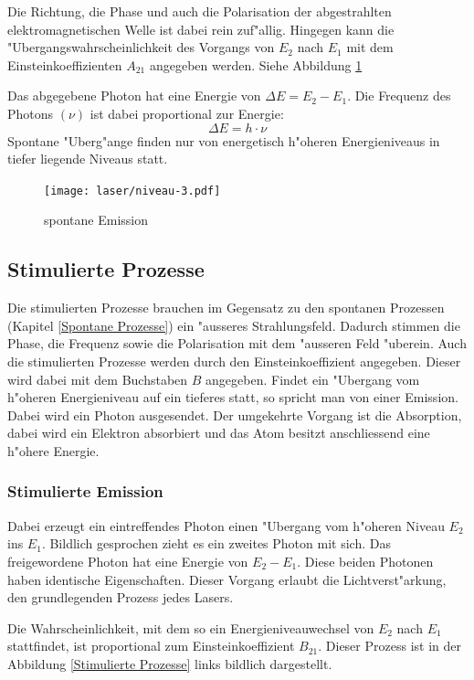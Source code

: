\begin{refsection}
Die Richtung, die Phase und auch die Polarisation der abgestrahlten
elektromagnetischen Welle ist dabei rein zuf"allig.
Hingegen kann die "Ubergangswahrscheinlichkeit des Vorgangs von $E_2$ nach
$E_1$ mit dem Einsteinkoeffizienten $A_{21}$ angegeben werden.
Siehe Abbildung \ref{spontane Emission}

Das abgegebene Photon hat eine Energie von $\Delta E = E_2 - E_1$.
Die Frequenz des Photons $(\nu)$ ist dabei proportional zur Energie:
\[ \Delta E = h\cdot \nu\]
Spontane "Uberg"ange finden nur von energetisch h"oheren Energieniveaus in
tiefer liegende Niveaus statt.

\begin{figure}
\centering
\texttt{[image: laser/niveau-3.pdf]}
\caption{spontane Emission}
\label{spontane Emission}
\end{figure}


\subsection{Stimulierte Prozesse}
Die stimulierten Prozesse brauchen im Gegensatz zu den spontanen
Prozessen (Kapitel \ref{Spontane Prozesse}) ein "ausseres Strahlungsfeld.
Dadurch stimmen die Phase, die Frequenz sowie die Polarisation mit dem
"ausseren Feld "uberein.
Auch die stimulierten Prozesse werden durch den Einsteinkoeffizient angegeben.
Dieser wird dabei mit dem Buchstaben $B$ angegeben.
Findet ein "Ubergang vom h"oheren Energieniveau auf ein tieferes statt,
so spricht man von einer Emission. Dabei wird ein Photon ausgesendet.
Der umgekehrte Vorgang ist die Absorption, dabei wird ein Elektron absorbiert
und das Atom besitzt anschliessend eine h"ohere Energie.


\subsubsection{Stimulierte Emission}

Dabei erzeugt ein eintreffendes Photon einen "Ubergang vom h"oheren Niveau
$E_2$ ins $E_1$. 
Bildlich gesprochen zieht es ein zweites Photon mit sich.
Das freigewordene Photon hat eine Energie von $E_2 - E_1$.
Diese beiden Photonen haben identische Eigenschaften.
Dieser Vorgang erlaubt die Lichtverst"arkung, den grundlegenden Prozess jedes
Lasers.

Die Wahrscheinlichkeit, mit dem so ein Energieniveauwechsel von $E_2$ nach
$E_1$ stattfindet, ist proportional zum Einsteinkoeffizient $B_{21}$.
Dieser Prozess ist in der Abbildung \ref{Stimulierte Prozesse} links bildlich
dargestellt.


\end{refsection}
